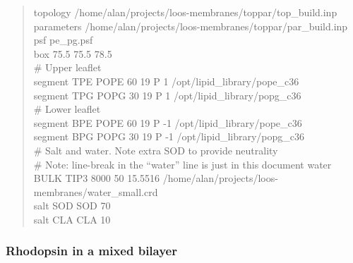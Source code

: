 \documentclass[12pt]{article}
\begin{document}
\begin{quote}
topology /home/alan/projects/loos-membranes/toppar/top\_build.inp \\
parameters /home/alan/projects/loos-membranes/toppar/par\_build.inp \\
psf      pe\_pg.psf \\
box      75.5  75.5  78.5 \\

\# Upper leaflet \\
segment TPE       POPE     60    19    P 1      /opt/lipid\_library/pope\_c36 \\
segment TPG       POPG     30    19    P 1      /opt/lipid\_library/popg\_c36 \\

\# Lower leaflet \\
segment BPE       POPE     60    19   P -1      /opt/lipid\_library/pope\_c36 \\
segment BPG       POPG     30    19   P -1      /opt/lipid\_library/popg\_c36 \\

\# Salt and water.  Note extra SOD to provide neutrality \\
\# Note: line-break in the ``water'' line is just in this document
water   BULK     TIP3      8000       50      15.5516
/home/alan/projects/loos-membranes/water\_small.crd \\
salt    SOD       SOD      70 \\
salt    CLA       CLA      10 \\

\end{quote}

\subsubsection{Rhodopsin in a mixed bilayer}
\end{document}
